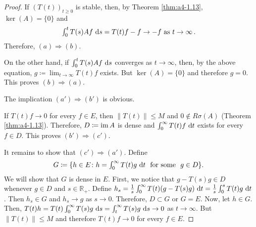 \begin{proof}
If $(T(t))_{t \geq 0}$ is stable, then, by Theorem \ref{thm:a4-1.13}, $\ker(A) = \{0\}$ and
\[\textstyle{
\int_{0}^{t} T(s)Af \,\mathop{}\!\mathrm{d}{s}= T(t)f - f \to -f \ \text{as} \ t \to \infty\,.
}\]
Therefore, $(a) \Rightarrow (b)$.

On the other hand, if $\int_{0}^{t} T(s)Af \,\mathop{}\!\mathrm{d}{s}$ converges as $t \to \infty$, then, by
the above equation, $g \coloneqq \lim_{t \to \infty} T(t)f$ exists. 
But $\ker(A) = \{0\}$ and
therefore $g = 0$. 
This proves $(b) \Rightarrow (a)$.

The implication $(a') \Rightarrow (b')$ is obvious. 

If $T(t)f \to 0$ for every $f \in E$, then $\|T(t)\| \leq M$ and $0 \not\in R\sigma(A)$ (Theorem \ref{thm:a4-1.13}). 
Therefore,
$D \coloneqq \mathop{}\!\mathrm{im}\, A$ is dense and $\int_{0}^{\infty} T(t)f \,\mathop{}\!\mathrm{d}{t}$ exists for every $f \in D$. 
This proves $(b') \Rightarrow (c')$. 

It remains to show that $(c') \Rightarrow (a')$.
Define 
\[\textstyle{
G \coloneqq \{h \in E \colon h = \int_{0}^{\infty} T(t)g \,\mathop{}\!\mathrm{d}{t}\ \text{ for some } \ g \in D\}.
}\] 
We will show that $G$ is dense in $E$. 
First, we notice that $g - T(s)g \in D$ whenever $g \in D$
and $s \in \mathbb{R}_{+}$.
Define $h_{s} = \frac{1}{s} \int_{0}^{\infty} T(t)(g - T(s)g) \,\mathop{}\!\mathrm{d}{t} = \frac{1}{s} \int_{0}^{s} T(t)g \,\mathop{}\!\mathrm{d}{t}$. 
Then $h_{s} \in G$
and $h_{s} \to g$ as $s \to 0$. 
Therefore, $D \subset G$ or $G = E$. 
Now, let $h \in G$.
Then, $T(t)h = T(t) \int_{0}^{\infty} T(s)g \,\mathop{}\!\mathrm{d}{s} = \int_{t}^{\infty} T(s)g \,\mathop{}\!\mathrm{d}{s} \to 0$ as $t \to \infty$. 
But $\|T(t)\| \leq M$ and therefore $T(t)f \to 0$ for every $f \in E$.
\end{proof}

